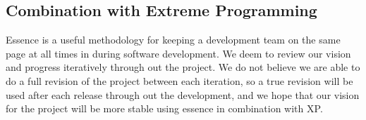 
\subsection{Combination with Extreme Programming}
\label{sub:combination_with_extreme_programming}
Essence is a useful methodology for keeping a development team on the same page at all times in during software development. We deem to review our vision and progress iteratively through out the project. We do not believe we are able to do a full revision of the project between each iteration, so a true revision will be used after each release through out the development, and we hope that our vision for the project will be more stable using essence in combination with XP.

